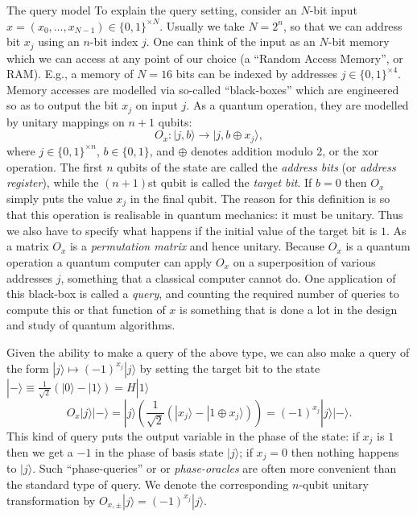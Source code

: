 \documentclass[12pt,oneside]{amsart}
\makeatletter
\def\subsubsection{\@startsection{subsubsection}{3}%
  \z@{.5\linespacing\@plus.7\linespacing}{-.5em}%
  {\color{cgblue}\normalfont\sf\itshape}}
\theoremstyle{plain}%
\theoremstyle{definition}
\theoremstyle{remark}
\makeatother
\begin{document}
\subsubsection{The query model}
To explain the query setting, consider an $N$-bit input $x = (x_0, \ldots , x_{N−1}) \in \{0, 1\}^{\times N}$. Usually we take $N=2^n$, so that we can address bit $x_j$ using an $n$-bit index $j$. One can think of the input
as an $N$-bit memory which we can access at any point of our choice (a ``Random Access Memory'',
or RAM). E.g., a memory of $N = 16$ bits can be indexed by addresses $j\in \{0,1\}^{\times 4}$. Memory accesses are modelled via so-called ``black-boxes'' which are engineered so as to output the bit $x_j$ on input $j$. As a quantum operation, they are modelled by unitary mappings on $n + 1$ qubits:
\begin{equation}
  O_x:|j,b\rangle \rightarrow |j,b\oplus x_j\rangle,
\end{equation}
where $j\in \{0,1\}^{\times n}$, $b\in \{0,1\}$, and $\oplus$ denotes addition modulo 2, or the {\sc xor} operation. The first $n$ qubits of the state are called the \emph{address bits} (or \emph{address register}), while the $(n + 1)$st qubit is called the \emph{target bit}. If $b=0$ then $O_x$ simply puts the value $x_j$ in the final qubit. The reason for this definition is so that this operation is realisable in quantum mechanics: it must be unitary. Thus we also have to specify what happens if the initial value of the target bit is $1$. As a matrix $O_x$ is a \emph{permutation matrix} and hence unitary. Because $O_x$ is a quantum operation a quantum computer can apply $O_x$ on a superposition of various addresses $j$, something that a classical computer cannot do. One application of this black-box is called a \emph{query}, and counting the required number of queries to compute
this or that function of $x$ is something that is done a lot in the design and study of quantum algorithms.

Given the ability to make a query of the above type, we can also make a query of the form $|j\rangle \mapsto (-1)^{x_j}|j\rangle$ by setting the target bit to the state $|-\rangle \equiv \frac{1}{\sqrt{2}}(|0\rangle -|1\rangle) = H|1\rangle$
\begin{equation}
  O_x |j\rangle|-\rangle = |j\rangle \left(\frac{1}{\sqrt{2}}(|x_j\rangle -|1\oplus x_j\rangle)\right) = (-1)^{x_j}|j\rangle|-\rangle.
\end{equation}
This kind of query puts the output variable in the phase of the state: if $x_j$ is $1$ then we get a $−1$ in the phase of basis state $|j\rangle$; if $x_j = 0$ then nothing happens to $|j\rangle$. Such ``phase-queries'' or 
or \emph{phase-oracles} are often more convenient than the standard type of query. We denote the
corresponding $n$-qubit unitary transformation by $O_{x,\pm}|j\rangle = (-1)^{x_j}|j\rangle$.
\end{document}
